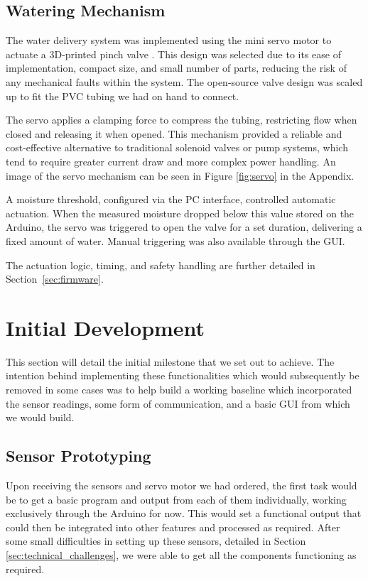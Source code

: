\documentclass[a4paper,11pt]{article}
\begin{document}
\subsection{Watering Mechanism}
\label{sec:water_system}

The water delivery system was implemented using the mini servo motor to actuate a 
3D-printed pinch valve \cite{pinch_valve_design}. 
This design was selected due to its ease of implementation, compact size, 
and small number of parts,
reducing the risk of any mechanical faults within the system. 
The open-source valve design was scaled up 
to fit the PVC tubing we had on hand to connect.

The servo applies a clamping force to compress the tubing, restricting flow when closed 
and releasing it when opened. This mechanism provided a reliable and cost-effective 
alternative to traditional solenoid valves or pump systems, which tend to require 
greater current draw and more complex power handling.
An image of the servo mechanism can be seen in Figure \ref{fig:servo}
in the Appendix.

A moisture threshold, configured via the PC interface, controlled automatic actuation. 
When the measured moisture dropped below this value stored on the Arduino, 
the servo was triggered to open the valve for a set duration, 
delivering a fixed amount of water. 
Manual triggering was also available through the GUI.

The actuation logic, timing, and safety handling are further detailed in 
Section~\ref{sec:firmware}. 

\section{Initial Development}
\label{sec:initial_development}

This section will detail the initial milestone that we set out to achieve.
The intention behind implementing these functionalities
which would subsequently be removed in some cases
was to help build a working baseline which incorporated the sensor readings,
some form of communication, and a basic GUI from which we would build.

\subsection{Sensor Prototyping}
\label{sec:sensor_prototyping}

Upon receiving the sensors and servo motor we had ordered,
the first task would be to get a basic program and output from each of them individually,
working exclusively through the Arduino for now.
This would set a functional output that could then be integrated into other features
and processed as required.
After some small difficulties in setting up these sensors,
detailed in Section \ref{sec:technical_challenges},
we were able to get all the components functioning as required.
\end{document}
